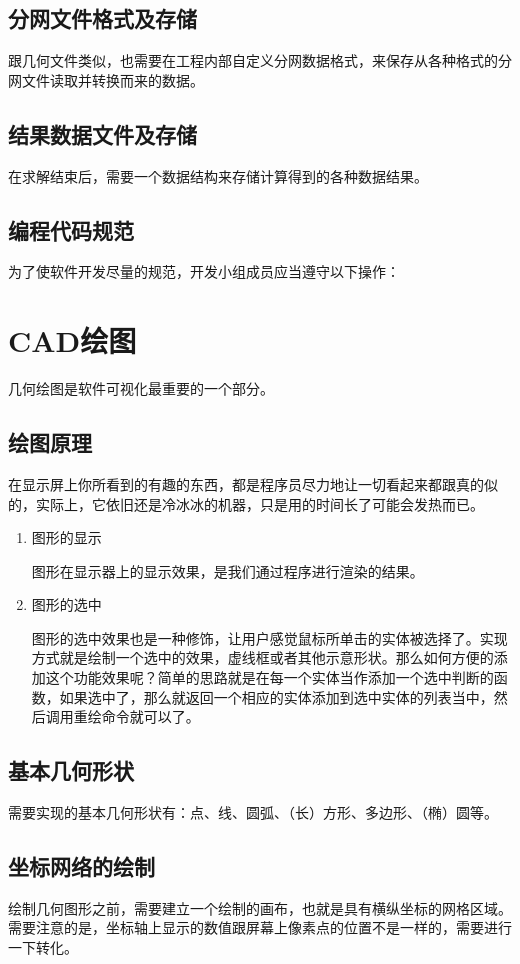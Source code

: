 \subsection{分网文件格式及存储}
跟几何文件类似，也需要在工程内部自定义分网数据格式，来保存从各种格式的分网文件读取并转换而来的数据。
\subsection{结果数据文件及存储}
在求解结束后，需要一个数据结构来存储计算得到的各种数据结果。
\subsection{编程代码规范}
为了使软件开发尽量的规范，开发小组成员应当遵守以下操作：
\section{CAD绘图}
几何绘图是软件可视化最重要的一个部分。
\subsection{绘图原理}
在显示屏上你所看到的有趣的东西，都是程序员尽力地让一切看起来都跟真的似的，实际上，它依旧还是冷冰冰的机器，只是用的时间长了可能会发热而已。

\begin{enumerate}
	\item 图形的显示
	
\hspace*{2em} 图形在显示器上的显示效果，是我们通过程序进行渲染的结果。
	\item 图形的选中
	
\hspace*{2em} 图形的选中效果也是一种修饰，让用户感觉鼠标所单击的实体被选择了。实现方式就是绘制一个选中的效果，虚线框或者其他示意形状。那么如何方便的添加这个功能效果呢？简单的思路就是在每一个实体当作添加一个选中判断的函数，如果选中了，那么就返回一个相应的实体添加到选中实体的列表当中，然后调用重绘命令就可以了。
\end{enumerate}
\subsection{基本几何形状}
需要实现的基本几何形状有：点、线、圆弧、（长）方形、多边形、（椭）圆等。
\subsection{坐标网络的绘制}
绘制几何图形之前，需要建立一个绘制的画布，也就是具有横纵坐标的网格区域。需要注意的是，坐标轴上显示的数值跟屏幕上像素点的位置不是一样的，需要进行一下转化。

